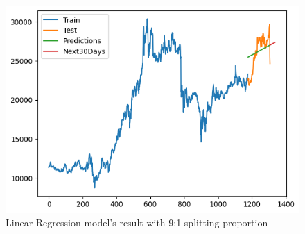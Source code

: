 \documentclass{ieeeojies}
\begin{document}
\begin{figure}[H]
  \centering
  \begin{minipage}{0.6\linewidth}
    \centering
    \includegraphics[width=\linewidth]{bibliography/diagram/LR-ACB.png}
    \caption{Linear Regression model’s result with 9:1 splitting proportion}
    \label{fig8}
  \end{minipage}
\end{figure}
\end{document}
